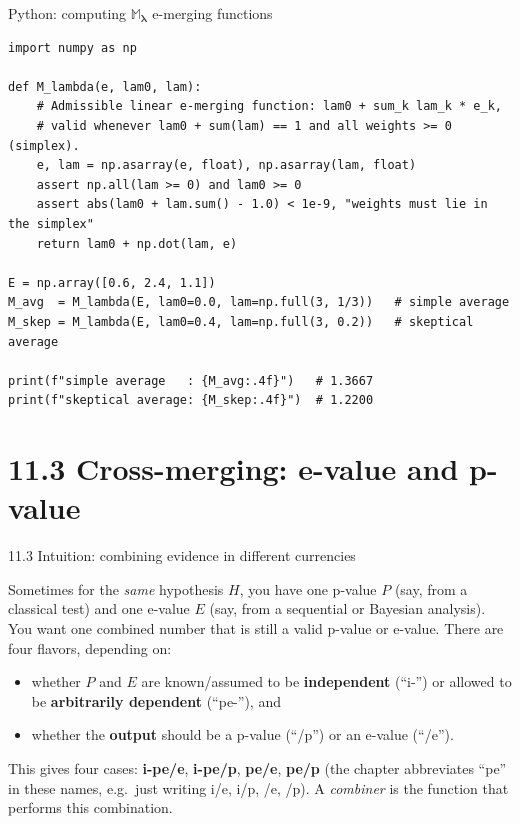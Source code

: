 \documentclass[aspectratio=169,10pt]{beamer}
\newcommand{\1}{\mathbb{1}}
\begin{document}
\begin{frame}[fragile]{Python: computing $\mathbb{M}_{\boldsymbol\lambda}$ e-merging functions}

\begin{lstlisting}
import numpy as np

def M_lambda(e, lam0, lam):
    # Admissible linear e-merging function: lam0 + sum_k lam_k * e_k,
    # valid whenever lam0 + sum(lam) == 1 and all weights >= 0 (simplex).
    e, lam = np.asarray(e, float), np.asarray(lam, float)
    assert np.all(lam >= 0) and lam0 >= 0
    assert abs(lam0 + lam.sum() - 1.0) < 1e-9, "weights must lie in the simplex"
    return lam0 + np.dot(lam, e)

E = np.array([0.6, 2.4, 1.1])
M_avg  = M_lambda(E, lam0=0.0, lam=np.full(3, 1/3))   # simple average
M_skep = M_lambda(E, lam0=0.4, lam=np.full(3, 0.2))   # skeptical average

print(f"simple average   : {M_avg:.4f}")   # 1.3667
print(f"skeptical average: {M_skep:.4f}")  # 1.2200
\end{lstlisting}

\end{frame}

\section{11.3 Cross-merging: e-value and p-value}

\begin{frame}[allowframebreaks]{11.3 Intuition: combining evidence in different currencies}

Sometimes for the \emph{same} hypothesis $H$, you have one p-value $P$ (say, from a classical test) and one e-value $E$ (say, from a sequential or Bayesian analysis). You want one combined number that is still a valid p-value or e-value. There are four flavors, depending on:

\begin{itemize}
\item whether $P$ and $E$ are known/assumed to be \textbf{independent} (``i-'') or allowed to be \textbf{arbitrarily dependent} (``pe-''), and
\item whether the \textbf{output} should be a p-value (``/p'') or an e-value (``/e'').
\end{itemize}

This gives four cases: \textbf{i-pe/e}, \textbf{i-pe/p}, \textbf{pe/e}, \textbf{pe/p} (the chapter abbreviates ``pe'' in these names, e.g.\ just writing i/e, i/p, /e, /p). A \emph{combiner} is the function that performs this combination.

\end{frame}
\end{document}
